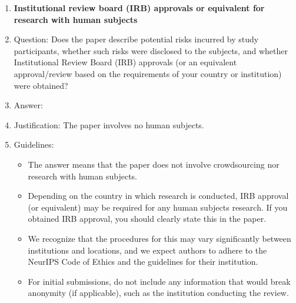 \begin{enumerate}
\item {\bf Institutional review board (IRB) approvals or equivalent for research with human subjects}
    \item[] Question: Does the paper describe potential risks incurred by study participants, whether such risks were disclosed to the subjects, and whether Institutional Review Board (IRB) approvals (or an equivalent approval/review based on the requirements of your country or institution) were obtained?
    \item[] Answer: \answerNA{}
    \item[] Justification: The paper involves no human subjects.
    \item[] Guidelines:
    \begin{itemize}
        \item The answer \answerNA{} means that the paper does not involve crowdsourcing nor research with human subjects.
        \item Depending on the country in which research is conducted, IRB approval (or equivalent) may be required for any human subjects research. If you obtained IRB approval, you should clearly state this in the paper. 
        \item We recognize that the procedures for this may vary significantly between institutions and locations, and we expect authors to adhere to the NeurIPS Code of Ethics and the guidelines for their institution. 
        \item For initial submissions, do not include any information that would break anonymity (if applicable), such as the institution conducting the review.
    \end{itemize}


\end{enumerate}
